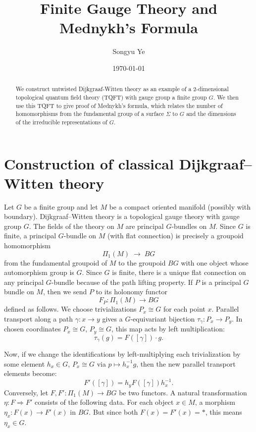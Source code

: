 \documentclass[12pt]{article}
\begin{document}
\rhead{\today}
\cfoot{\thepage}

\title{Finite Gauge Theory and Mednykh's Formula}

\author{Songyu Ye}
\date{\today}
\maketitle


\begin{abstract}
    We construct untwisted Dijkgraaf-Witten theory as an example of a 2-dimensional topological quantum field theory (TQFT) with gauge group a finite group $G$. We then use this TQFT to give proof of Mednykh's formula, which relates the number of homomorphisms from the fundamental group of a surface $\Sigma$ to $G$ and the dimensions of the irreducible representations of $G$.
\end{abstract}

\tableofcontents
\section{Construction of classical Dijkgraaf--Witten theory}
Let $G$ be a finite group and let $M$ be a compact oriented manifold (possibly with boundary). Dijkgraaf--Witten theory is a topological gauge theory with gauge group $G$. The fields of the theory on $M$ are principal $G$-bundles on $M$. Since $G$ is finite, a principal $G$-bundle on $M$ (with flat connection) is precisely a groupoid homomorphism
\[
    \Pi_1(M) \;\longrightarrow\; BG
\] from the fundamental groupoid of $M$ to the groupoid $BG$ with one object whose automorphism group is $G$. Since $G$ is finite, there is a unique flat connection on any principal $G$-bundle because of the path lifting property.
 If $P$ is a principal $G$ bundle on $M$, then we send $P$ to its holonomy functor 
\[F_P : \Pi_1(M) \to BG\] 
defined as follows. We choose trivializations $P_x \cong G$ for each point $x$. Parallel transport along a path $\gamma:x\to y$ gives a $G$-equivariant bijection $\tau_\gamma : P_x \to P_y$. In chosen coordinates $P_x \cong G$, $P_y \cong G$, this map acts by left multiplication:
\[\tau_\gamma(g) = F([\gamma]) \cdot g.\]

Now, if we change the identifications by left-multiplying each trivialization by some element $h_x \in G$, $P_x \cong G$ via $p \mapsto h_x^{-1} g$, then the new parallel transport elements become:
\[F'([\gamma]) = h_y F([\gamma]) h_x^{-1}.\]
Conversely, let $F, F': \Pi_1(M) \to BG$ be two functors. A natural transformation $\eta: F \Rightarrow F'$ consists of the following data. For each object $x\in M$, a morphism $\eta_x : F(x) \to F'(x)$ in $BG$. But since both $F(x)=F'(x)=*$, this means $\eta_x \in G$.
\end{document}
